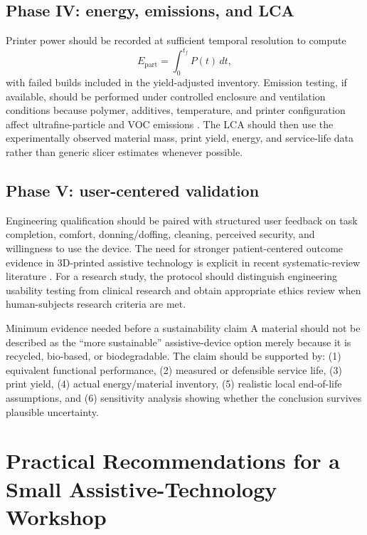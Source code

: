 \documentclass[11pt]{article}
\begin{document}
\subsection{Phase IV: energy, emissions, and LCA}

Printer power should be recorded at sufficient temporal resolution to compute
\begin{equation}
E_{\mathrm{part}}=\int_0^{t_f}P(t)\,dt,
\end{equation}
with failed builds included in the yield-adjusted inventory. Emission testing, if available, should be performed under controlled enclosure and ventilation conditions because polymer, additives, temperature, and printer configuration affect ultrafine-particle and VOC emissions \cite{stephens2013,azimi2016,niosh2023}. The LCA should then use the experimentally observed material mass, print yield, energy, and service-life data rather than generic slicer estimates whenever possible.

\subsection{Phase V: user-centered validation}

Engineering qualification should be paired with structured user feedback on task completion, comfort, donning/doffing, cleaning, perceived security, and willingness to use the device. The need for stronger patient-centered outcome evidence in 3D-printed assistive technology is explicit in recent systematic-review literature \cite{rasmussen2026}. For a research study, the protocol should distinguish engineering usability testing from clinical research and obtain appropriate ethics review when human-subjects research criteria are met.

\begin{keybox}{Minimum evidence needed before a sustainability claim}
A material should not be described as the ``more sustainable'' assistive-device option merely because it is recycled, bio-based, or biodegradable. The claim should be supported by: (1) equivalent functional performance, (2) measured or defensible service life, (3) print yield, (4) actual energy/material inventory, (5) realistic local end-of-life assumptions, and (6) sensitivity analysis showing whether the conclusion survives plausible uncertainty.
\end{keybox}

\section{Practical Recommendations for a Small Assistive-Technology Workshop}
\end{document}
